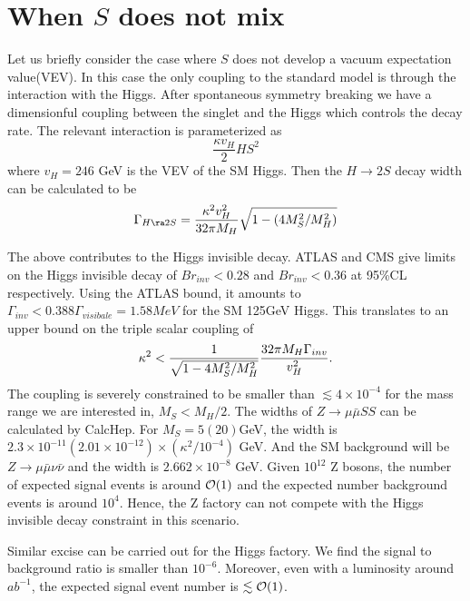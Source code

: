 \documentclass[11pt]{article}
\begin{document}
\section{When $S$ does not mix}\label{sec:vevless}
Let us briefly consider the case where $S$ does not develop a vacuum expectation value(VEV). In this case the only coupling to the standard model is through the interaction with the Higgs.
After spontaneous symmetry breaking we have a dimensionful coupling between the singlet and the Higgs which controls the decay rate. The relevant interaction is parameterized as
\begin{equation}
\frac{\kappa v_H}{2} H S^2
\end{equation}
where $v_H=246$ GeV is the  VEV of the SM Higgs.
Then the $H\to 2S$ decay width can be calculated to be
\begin{equation}
\Gamma_{H\ra 2S}= {\kappa^2 v_H^2 \over 32 \pi M_H}\sqrt{1-(4M_S^2/M_H^2)}
\end{equation}

 The above contributes to the Higgs invisible decay.  ATLAS\cite{Aad:2015txa} and CMS\cite{CMS:2015naa} give limits on the Higgs invisible decay of $Br_{inv}<0.28$ and $Br_{inv}<0.36$ at 95\%CL respectively.
Using the ATLAS bound, it amounts to $\Gamma_{inv}<0.388 \Gamma_{visibale}= 1.58 MeV$ for the SM 125GeV Higgs.
This translates to an upper bound on the triple scalar coupling of
\begin{equation}
\kappa^2 <{1\over\sqrt{1-4M_S^2/M_H^2}}{32 \pi M_H \Gamma_{inv} \over v_H^2}.
\end{equation}
The coupling is severely constrained to be smaller than  $\lesssim 4\times 10^{-4}$ for the mass range we are interested in, $M_S< M_H/2$.
The widths of $Z\to \mu\bar{\mu} S S$ can be calculated by CalcHep.
For $M_S= 5(20)$GeV, the width is $2.3\times 10^{-11}(2.01\times 10^{-12}) \times (\kappa^2/10^{-4}) $ GeV.
And the SM background will be $Z\to \mu\bar{\mu} \nu\bar{\nu}$ and the width is $2.662\times 10^{-8}$ GeV.
Given $10^{12}$ Z bosons, the number of expected signal events is around ${\cal O}(1)$ and the expected number background events is around $10^4$.
Hence, the Z factory can not compete with the Higgs invisible decay constraint in this scenario.

Similar excise can be carried out for the Higgs factory. We find the signal to background ratio is smaller than $10^{-6}$.
Moreover, even with a luminosity around $ab^{-1}$, the expected signal event number is $\lesssim {\cal O}(1)$.
\end{document}
